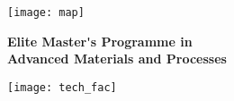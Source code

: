 \begin{titlepage}
\clearpage
\noindent%
\texttt{[image: map]}%
\begin{minipage}[b]{0.5\textwidth}
\centering
\textbf{Elite Master\'{}s Programme in} \\
\textbf{Advanced Materials and Processes}
\end{minipage}%
\texttt{[image: tech\_fac]}
\thispagestyle{empty}











\end{titlepage}